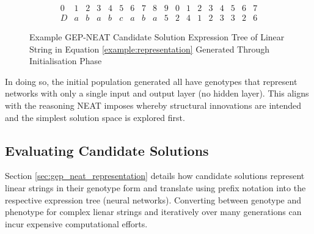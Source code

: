 \begin{equation}\label{example:gep_neat_initial}
    \begin{array}{cccccccccccccccccc}
        0 & 1 & 2 & 3 & 4 & 5 & 6 & 7 & 8 & 9 & 0 & 1 & 2 & 3 & 4 & 5 & 6 & 7 \\
        D & a & b & a & b & c & a & b & a & 5 & 2 & 4 & 1 & 2 & 3 & 3 & 2 & 6
    \end{array}
\end{equation}

\begin{figure}[H] %
	\centering %
	\caption{Example GEP-NEAT Candidate Solution Expression Tree of Linear String in Equation \ref{example:representation} Generated Through Initialisation Phase}
	\label{fig:gep_neat_initial_example} %
\end{figure}

\noindent In doing so, the initial population generated all have genotypes that represent networks with only a single input and output layer (no hidden layer). This aligns with the reasoning NEAT imposes whereby structural innovations are intended and the simplest solution space is explored first.


\subsection{Evaluating Candidate Solutions}
Section \ref{sec:gep_neat_representation} details how candidate solutions represent linear strings in their genotype form and translate using prefix notation into the respective expression tree (neural networks). Converting between genotype and phenotype for complex lienar strings and iteratively over many generations can incur expensive computational efforts. \bigskip

